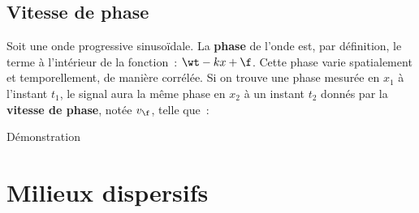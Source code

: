 \documentclass[../main/main.tex]{subfiles}
\begin{document}
\subsection{Vitesse de phase}

Soit une onde progressive sinusoïdale. La \textbf{phase} de l'onde est, par
définition, le terme à l'intérieur de la fonction~: $\wt-kx+\f$. Cette phase
varie spatialement et temporellement, de manière corrélée. Si on trouve une
phase mesurée en $x_1$ à l'instant $t_1$, le signal aura la même phase en $x_2$
à un instant $t_2$ donnés par la \textbf{vitesse de phase}, notée $v_\f$, telle
que~:
\vspace{-10pt}
\vspace{-10pt}
\begin{bdemoside}{{\small Démonstration}}
    \vspace{-10pt}
    \tcblower
    \centering
    \vspace{-10pt}
\end{bdemoside}

\section{Milieux dispersifs}
\end{document}
